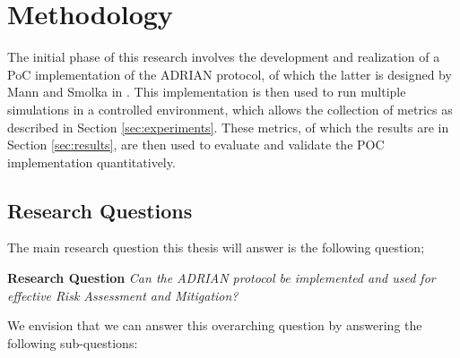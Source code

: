 \section{Methodology}
\label{sec:methodology}
The initial phase of this research involves the development and realization of a PoC implementation of the ADRIAN protocol, of which the latter is designed by Mann and Smolka in \cite{mann2023ADRIAN}. This implementation is then used to run multiple simulations in a controlled environment, which allows the collection of metrics as described in Section \ref{sec:experiments}. These metrics, of which the results are in Section \ref{sec:results}, are then used to evaluate and validate the POC implementation quantitatively. 


\subsection{Research Questions}
\label{ssec:research-questions}

The main research question this thesis will answer is the following question;

\vspace{0.5em}
\noindent\textbf{Research Question}\label{rq} \emph{Can the ADRIAN protocol be implemented and used for effective Risk Assessment and Mitigation?}\vspace{1em}

We envision that we can answer this overarching question by answering the following sub-questions:



